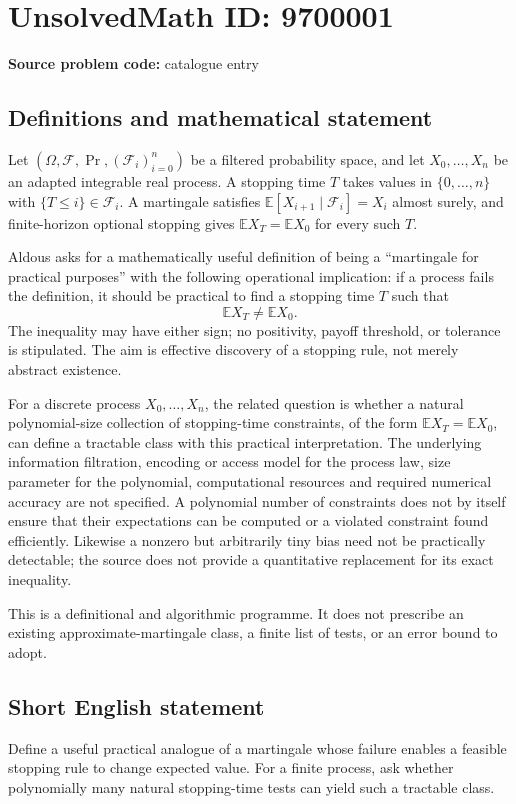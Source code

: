 \documentclass[11pt]{article}
\newcommand{\E}{\mathbb{E}}
\begin{document}
\section*{UnsolvedMath ID: 9700001}
\textbf{Source problem code:} catalogue entry
\subsection{Definitions and mathematical statement}
Let \((\Omega,\mathcal F,\Pr,(\mathcal F_i)_{i=0}^n)\) be a filtered probability space, and let \(X_0,\ldots,X_n\) be an adapted integrable real process. A stopping time \(T\) takes values in \(\{0,\ldots,n\}\) with \(\{T\leq i\}\in\mathcal F_i\). A martingale satisfies \(\E[X_{i+1}\mid\mathcal F_i]=X_i\) almost surely, and finite-horizon optional stopping gives \(\E X_T=\E X_0\) for every such \(T\).

Aldous asks for a mathematically useful definition of being a ``martingale for practical purposes'' with the following operational implication: if a process fails the definition, it should be practical to find a stopping time \(T\) such that
\[
 \E X_T\ne\E X_0.
\]
The inequality may have either sign; no positivity, payoff threshold, or tolerance is stipulated. The aim is effective discovery of a stopping rule, not merely abstract existence.

For a discrete process \(X_0,\ldots,X_n\), the related question is whether a natural polynomial-size collection of stopping-time constraints, of the form \(\E X_T=\E X_0\), can define a tractable class with this practical interpretation. The underlying information filtration, encoding or access model for the process law, size parameter for the polynomial, computational resources and required numerical accuracy are not specified. A polynomial number of constraints does not by itself ensure that their expectations can be computed or a violated constraint found efficiently. Likewise a nonzero but arbitrarily tiny bias need not be practically detectable; the source does not provide a quantitative replacement for its exact inequality.

This is a definitional and algorithmic programme. It does not prescribe an existing approximate-martingale class, a finite list of tests, or an error bound to adopt.
\subsection{Short English statement}
Define a useful practical analogue of a martingale whose failure enables a feasible stopping rule to change expected value. For a finite process, ask whether polynomially many natural stopping-time tests can yield such a tractable class.
\end{document}

